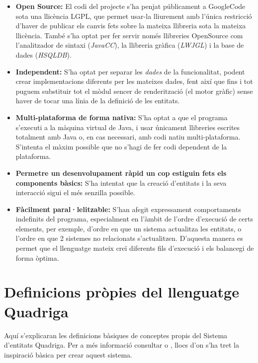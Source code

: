   \begin{itemize}
    \item {\bf Open Source:} El codi del projecte s'ha penjat públicament a GoogleCode sota una llicència LGPL, que permet usar-la lliurement amb l'única restricció d'haver de publicar els canvis fets sobre la mateixa llibreria sota la mateixa llicència. També s'ha optat per fer servir només llibreries OpenSource com l'analitzador de sintaxi ({\em JavaCC}), la llibreria gràfica ({\em LWJGL}) i la base de dades ({\em HSQLDB}).
      
    \item {\bf Independent:} S'ha optat per separar les {\em dades} de la funcionalitat, podent crear implementacions diferents per les mateixes dades, fent així que fins i tot puguem substituir tot el mòdul sencer de renderització (el motor gràfic) sense haver de tocar una línia de la definició de les entitats.
      
    \item {\bf Multi-plataforma de forma nativa:} S'ha optat a que el programa s'executi a la màquina virtual de Java, i usar únicament llibreries escrites totalment amb Java o, en cas necessari, amb codi natiu multi-plataforma. S'intenta el màxim possible que no s'hagi de fer codi dependent de la plataforma.
      
    \item {\bf Permetre un desenvolupament ràpid un cop estiguin fets els components bàsics:} S'ha intentat que la creació d'entitats i la seva interacció sigui el més senzilla possible.
      
    \item {\bf Fàcilment paral·lelitzable:} S'han afegit expressament comportaments indefinits del programa, especialment en l'àmbit de l'ordre d'execució de certs elements, per exemple, d'ordre en que un sistema actualitza les entitats, o l'ordre en que 2 sistemes no relacionats s'actualitzen. D'aquesta manera es permet que el llenguatge mateix creï diferents fils d'execució i els balancegi de forma òptima.
  \end{itemize}
  
\section{Definicions pròpies del llenguatge Quadriga}

  Aquí s'explicaran les definicions bàsiques de conceptes propis del Sistema d'entitats Quadriga. Per a més informació consultar \cite{EntityWikiB} o \cite{Martin07}, llocs d'on s'ha tret la inspiració bàsica per crear aquest sistema.

